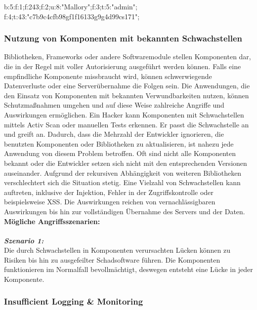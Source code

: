 \begin{LaTeXCode}[caption={Unsichere Deserialisierung - Beispiel 3},captionpos=b, label=LaTeXCode:ud3][numbers=none]
b:5:{f:1;f:243;f:2;u:8:"Mallory";f:3;t:5:"admin";
f:4;t:43:"c7b9c4cfb98gf1f16133g9g4d99cs171";}
\end{LaTeXCode}

\subsubsection{Nutzung von Komponenten mit bekannten Schwachstellen}

Bibliotheken, Frameworks oder andere Softwaremodule stellen Komponenten dar, die in der Regel mit voller Autorisierung ausgeführt werden können. Falls eine empfindliche Komponente missbraucht wird, können schwerwiegende Datenverluste oder eine Serverübernahme die Folgen sein. Die Anwendungen, die den Einsatz von Komponenten mit bekannten Verwundbarkeiten nutzen, können Schutzmaßnahmen umgehen und auf diese Weise zahlreiche Angriffe und Auswirkungen ermöglichen. Ein Hacker kann Komponenten mit Schwachstellen mittels Activ Scan oder manuellen Tests erkennen. Er passt die Schwachstelle an und greift an. Dadurch, dass die Mehrzahl der Entwickler ignorieren, die benutzten Komponenten oder Bibliotheken zu aktualisieren, ist nahezu jede Anwendung von diesem Problem betroffen. Oft sind nicht alle Komponenten bekannt oder die Entwickler setzen sich nicht mit den entsprechenden Versionen auseinander. Aufgrund der rekursiven Abhängigkeit von weiteren Bibliotheken verschlechtert sich die Situation stetig. Eine Vielzahl von Schwachstellen kann auftreten, inklusive der Injektion, Fehler in der Zugriffskontrolle oder beispielsweise XSS. Die Auswirkungen reichen von vernachlässigbaren Auswirkungen bis hin zur vollständigen Übernahme des Servers und der Daten\cite{owasp13top10}.\\

\textbf{Mögliche Angriffsszenarien:}\\
\\
\textbf{\textit{Szenario 1:}}\\

Die durch Schwachstellen in Komponenten verursachten Lücken können zu Risiken bis hin zu ausgefeilter Schadsoftware führen. Die Komponenten funktionieren im Normalfall bevollmächtigt, deswegen entsteht eine Lücke in jeder Komponente\cite{owasp13top10}.


\subsubsection{Insufficient Logging \& Monitoring}


